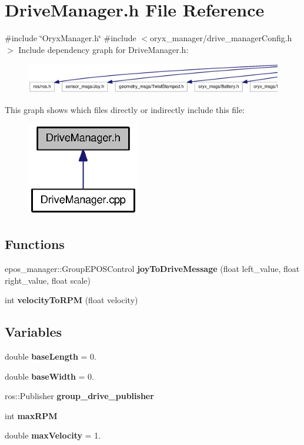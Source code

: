 \section{\-Drive\-Manager.\-h \-File \-Reference}
\label{DriveManager_8h}
{\ttfamily \#include \char`\"{}\-Oryx\-Manager.\-h\char`\"{}}\*
{\ttfamily \#include $<$oryx\-\_\-manager/drive\-\_\-manager\-Config.\-h$>$}\*
\-Include dependency graph for \-Drive\-Manager.\-h\-:
\nopagebreak
\begin{figure}[H]
\begin{center}
\leavevmode
\includegraphics[width=350pt]{DriveManager_8h__incl}
\end{center}
\end{figure}
\-This graph shows which files directly or indirectly include this file\-:
\nopagebreak
\begin{figure}[H]
\begin{center}
\leavevmode
\includegraphics[width=140pt]{DriveManager_8h__dep__incl}
\end{center}
\end{figure}
\subsection*{\-Functions}
\begin{DoxyCompactItemize}
\item 
epos\-\_\-manager\-::\-Group\-E\-P\-O\-S\-Control {\bf joy\-To\-Drive\-Message} (float left\-\_\-value, float right\-\_\-value, float scale)
\item 
int {\bf velocity\-To\-R\-P\-M} (float velocity)
\end{DoxyCompactItemize}
\subsection*{\-Variables}
\begin{DoxyCompactItemize}
\item 
double {\bf base\-Length} = 0.
\item 
double {\bf base\-Width} = 0.
\item 
ros\-::\-Publisher {\bf group\-\_\-drive\-\_\-publisher}
\item 
int {\bf max\-R\-P\-M}
\item 
double {\bf max\-Velocity} = 1.
\end{DoxyCompactItemize}


